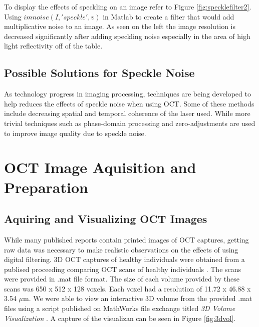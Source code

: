 \documentclass[%
reprint,
showpacs,preprintnumbers,
bibnotes,
amsmath,amssymb,
aps,
pra,
]{revtex4-1}
\begin{document}
		To display the effects of speckling on an image refer to Figure \ref{fig:specklefilter2}. Using $imnoise(I,'speckle',v)$ in Matlab to create a filter that would add multiplicative noise to an image. As seen on the left the image resolution is decreased significantly after adding speckling noise especially in the area of high light reflectivity off of the table.

	\subsection{\label{sec:level2} Possible Solutions for Speckle Noise}
		As technology progress in imaging processing, techniques are being developed to help reduces the effects of speckle noise when using OCT. Some of these methods include decreasing spatial and temporal coherence of the laser used. While more trivial techniques such as phase-domain processing and zero-adjustments are used to improve image quality due to speckle noise. \cite{Popescu2007}

	\section{\label{sec:level1} OCT Image Aquisition and Preparation}

	\subsection{\label{sec:level2} Aquiring and Visualizing OCT Images}
		While many published reports contain printed images of OCT captures, getting raw data was necessary to make realistic observations on the effects of using digital filtering. 3D OCT captures of healthy individuals were obtained from a publised proceeding comparing OCT scans of healthy individuals \cite{tahereh_2014}. The scans were provided in .mat file format. The size of each volume provided by these scans was 650 x 512 x 128 voxels. Each voxel had a resolution of 11.72 x 46.88 x 3.54 $\mu$m. We were able to view an interactive 3D volume from the provided .mat files using a script published on MathWorks file exchange titled \textit{3D Volume Visualization} \cite{stough}. A capture of the visualizan can be seen in Figure \ref{fig:3dvol}.
\end{document}
